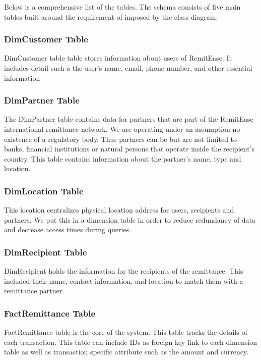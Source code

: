 \documentclass[onecolumn, letterpaper, ]{report}
\begin{document}
        Below is a comprehensive list of the tables. The schema consists of five main tables built around the requirement of imposed by the class diagram. 
        
        \subsubsection{DimCustomer Table} 
            DimCustomer table table stores information about users of RemitEase. It includes detail such a the user's name, email, phone number, and other essential information 
        \subsubsection{DimPartner Table}
        
            The DimPartner table contains data for partners that are part of the RemitEase international remittance network. We are operating under an assumption no existence of a regulatory body. Thus partners can be but are not limited to banks, financial institutions or natural persons that operate inside the recipient's country. This table contains information about the partner's name, type and location.

        \subsubsection{DimLocation Table}

            This location centralizes physical location address for users, recipients and partners. We put this in a dimension table in order to reduce redundancy of data and decrease access times during queries.

        \subsubsection{DimRecipient Table}

            DimRecipient holds the information for the recipients of the remittance. This included their name, contact information, and location to match them with a remittance partner. 
        \subsubsection{FactRemittance Table}

            FactRemittance table is the core of the system. This table tracks the details of each transaction. This table can include IDs as foreign key link to each dimension table as well as transaction specific attribute such as the amount and currency. 
\end{document}
